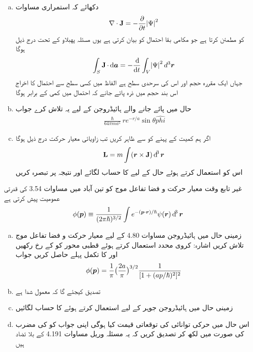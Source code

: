 \begin{enumerate}[a.]
\item
دکھائے کہ  استمراری مساوات 
\begin{align}
\nabla \cdot \operatorname{\mathbf{J}} = - \frac{\partial}{\partial t} \abs{\Psi}^2
\end{align}
کو مطمئن کرتا ہے جو مکامی بقا احتمال کو بیان کرتی ہے یوں مسئلہ پهبلاو کے تحت درج ذیل ہوگا 
\begin{align}
\int_S \mat{J} \cdot \dif \kvec{a} = - \frac{\dif}{\dif t} \int_V \abs{\Psi}^2 d^3 \kvec{r}
\end{align}
جہاں  ایک مقررہ حجم اور  اس کی سرحدی سطح ہے الفاظ میں کسی سطح سے احتمال کا اخراج اس بند حجم میں ذرہ پائے جانے کہ احتمال میں کمی کے برابر ہوگا 
\item
حال    میں پائے جانے والے ہائیڈروجن کے لیے یہ تلاش کرے جواب 
\begin{align*}
\frac{\hslash}{64 \pi m a^5} r e^{- r/a} \sin \theta \hat{phi}
\end{align*}
\item
اگر ہم کمیت کے پہنے کو  سے ظاہر کریں تب زاویائی معیار حرکت درج ذیل ہوگا 
\begin{align*}
\mat{L} = m \int (\kvec{r} \times \mat{J}) \dif^3 \kvec{r}
\end{align*}
اس کو استعمال کرتے ہوئے حال  کے لیے  کا حساب لگائے اور نتیجہ پر تبصرہ کریں 
\end{enumerate}
غیر تابع وقت معیار حرکت و فضا تفاعل موج کو تین آباد میں مساوات 3.54 کی قدرتی عمومیت پیش کرتی ہے 
\begin{align}
\phi (\kvec{p}) \equiv \frac{1}{(2 \pi \hslash)^{3/2}} \int e^{- (\kvec{p} \cdot \kvec{r})/\hslash} \psi (\kvec{r}) \dif^3 \kvec{r}
\end{align}
\begin{enumerate}[a.]
\item
زمینی حال میں ہائیڈروجن مساوات 4.80 کے لیے معیار حرکت و فضا تفاعل موج تلاش کریں اشارہ: کروی محدد استعمال کرتے ہوئے قطبی محور کو  کے رخ رکھیں اور  کا تکمل پہلے حاصل کریں جواب
\begin{align} 
\phi ({{\boldsymbol{p}}}) = \frac{1}{\pi} \big ( \frac{2a}{\pi} \big )^{3/2} \frac{1}{[1 + (a p/\hslash)^2]^2}
\end{align}
\item
تصدیق کیجئے گا کہ  معمول شدا ہے 
\item
زمینی حال میں ہائیڈروجن جوہر کے لیے  استعمال کرتے ہوئے  کا حساب لگائیں 
\item
اس حال میں حرکی توانائی کی توقعاتی قیمت کیا ہوگی اپنی جواب کو  کی مضرب کی صورت میں لکھ کر تصدیق کریں کہ یہ مسئلہ وريل مساوات 4.191 کے بلا تضاد ہیں 
\end{enumerate}
